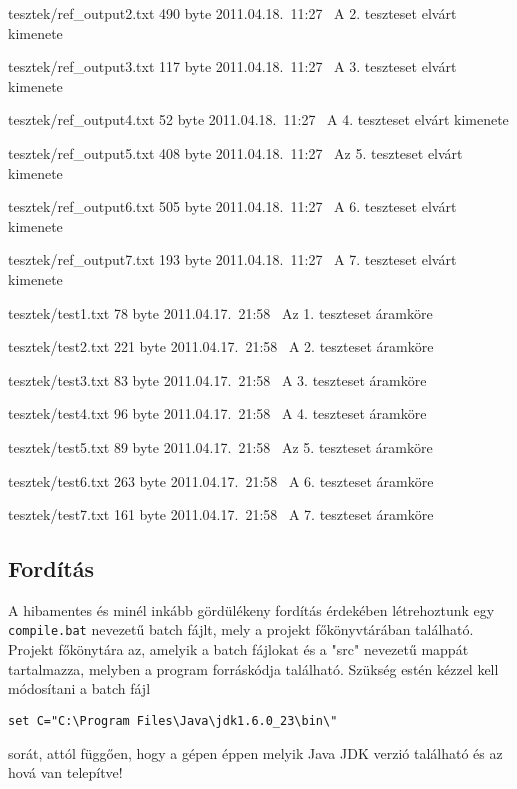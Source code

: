 \begin{fajllista}
\fajl
{tesztek/ref\_output2.txt} %
{490 byte} %
{2011.04.18.~11:27~} %
{A 2. teszteset elvárt kimenete} %

\fajl
{tesztek/ref\_output3.txt} %
{117 byte} %
{2011.04.18.~11:27~} %
{A 3. teszteset elvárt kimenete} %

\fajl
{tesztek/ref\_output4.txt} %
{52 byte} %
{2011.04.18.~11:27~} %
{A 4. teszteset elvárt kimenete} %

\fajl
{tesztek/ref\_output5.txt} %
{408 byte} %
{2011.04.18.~11:27~} %
{Az 5. teszteset elvárt kimenete} %

\fajl
{tesztek/ref\_output6.txt} %
{505 byte} %
{2011.04.18.~11:27~} %
{A 6. teszteset elvárt kimenete} %

\fajl
{tesztek/ref\_output7.txt} %
{193 byte} %
{2011.04.18.~11:27~} %
{A 7. teszteset elvárt kimenete} %

\fajl
{tesztek/test1.txt} %
{78 byte} %
{2011.04.17.~21:58~} %
{Az 1. teszteset áramköre} %

\fajl
{tesztek/test2.txt} %
{221 byte} %
{2011.04.17.~21:58~} %
{A 2. teszteset áramköre} %

\fajl
{tesztek/test3.txt} %
{83 byte} %
{2011.04.17.~21:58~} %
{A 3. teszteset áramköre} %

\fajl
{tesztek/test4.txt} %
{96 byte} %
{2011.04.17.~21:58~} %
{A 4. teszteset áramköre} %

\fajl
{tesztek/test5.txt} %
{89 byte} %
{2011.04.17.~21:58~} %
{Az 5. teszteset áramköre} %

\fajl
{tesztek/test6.txt} %
{263 byte} %
{2011.04.17.~21:58~} %
{A 6. teszteset áramköre} %

\fajl
{tesztek/test7.txt} %
{161 byte} %
{2011.04.17.~21:58~} %
{A 7. teszteset áramköre} %

\end{fajllista}

\subsection{Fordítás}
A hibamentes és minél inkább gördülékeny fordítás érdekében létrehoztunk egy \texttt{compile.bat} nevezetű batch fájlt, mely a projekt főkönyvtárában található. Projekt főkönytára az, amelyik a batch fájlokat és a "src" nevezetű mappát tartalmazza, melyben a program forráskódja található. Szükség estén kézzel kell módosítani a batch fájl
\begin{verbatim}
set C="C:\Program Files\Java\jdk1.6.0_23\bin\" 
\end{verbatim}
sorát, attól függően, hogy a gépen éppen melyik Java JDK verzió található és az hová van telepítve!\\

